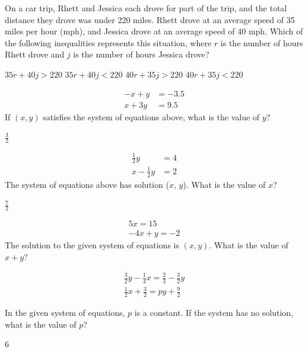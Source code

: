 \question[1]
On a car trip, Rhett and Jessica each drove for part of the trip, and the total distance they drove was under 220 miles. Rhett drove at an average speed of 35 miles per hour (mph), and Jessica drove at an average speed of 40 mph. Which of the following inequalities represents this situation, where $r$ is the number of hours Rhett drove and $j$ is the number of hours Jessica drove?
\begin{choices}
  \choice $35r + 40j > 220$
  \CorrectChoice $35r + 40j < 220$
  \choice $40r + 35j > 220$
  \choice $40r + 35j < 220$
\end{choices}

\newpage

\question[1]
\begin{align*}
  -x + y &= -3.5 \\
  x + 3y &= 9.5
\end{align*}
If $(x, y)$ satisfies the system of equations above, what is the value of $y$?
\begin{solutionorbox}
$\frac{3}{2}$
\end{solutionorbox}

\question[1]
\[
\begin{aligned}
\frac{1}{2}y &= 4 \\
x - \frac{1}{2}y &= 2
\end{aligned}
\]
The system of equations above has solution ($x$, $y$). What is the value of $x$?
\begin{choices}
  \choice $\frac{7}{2}$
\end{choices}



\question[1]
$$
\begin{gathered}
5x = 15 \\
-4x + y = -2
\end{gathered}
$$
The solution to the given system of equations is $(x, y)$. What is the value of $x + y$?
\begin{choices}
\end{choices}


\newpage

\question[1]
$$
\begin{gathered}
\frac{3}{2}y - \frac{1}{4}x = \frac{2}{3} - \frac{3}{2}y \\
\frac{1}{2}x + \frac{3}{2} = py + \frac{9}{2}
\end{gathered}
$$

In the given system of equations, $p$ is a constant. If the system has no solution, what is the value of $p$?
\begin{solutionorbox}
$6$
\end{solutionorbox}

